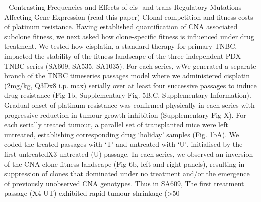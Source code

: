 - Contrasting Frequencies and Effects of cis- and trans-Regulatory Mutations Affecting Gene Expression (read this paper)
   Clonal competition and fitness costs of platinum resistance. Having established quantification of CNA associated subclone fitness, we next asked how clone-specific fitness is influenced under drug treatment. We tested how cisplatin, a standard therapy for primary TNBC,  impacted the stability of the fitness landscape of the three independent PDX TNBC series (SA609, SA535, SA1035). For each series, wWe generated a separate branch of the TNBC timeseries passages model where we administered cisplatin (2mg/kg,  Q3Dx8 i.p. max) serially over at least four successive passages to induce drug resistance (Fig 1b, Supplementary      Fig.  5B,C,  Supplementary  Information).	Gradual onset of platinum resistance was confirmed physically in each series with progressive reduction in tumour growth inhibition (Supplementary Fig X).  For  each  serially  treated  tumour,   a  parallel   set      of  transplanted  mice  were  left  untreated,  establishing  corresponding  drug  ‘holiday’ samples     (Fig. 1bA). We coded the treated passages with ‘T’ and untreated with ‘U’, initialised by the first untreatedX3     untreated (U) passage.  In each series, we observed an inversion of the CNA clone fitness landscape (Fig 6b, left and right panels), resulting in suppression of clones that dominated under no treatment and/or the emergence of previously unobserved CNA genotypes. Thus in SA609, The first treatment passage (X4 UT) exhibited rapid tumour shrinkage      (>50%
